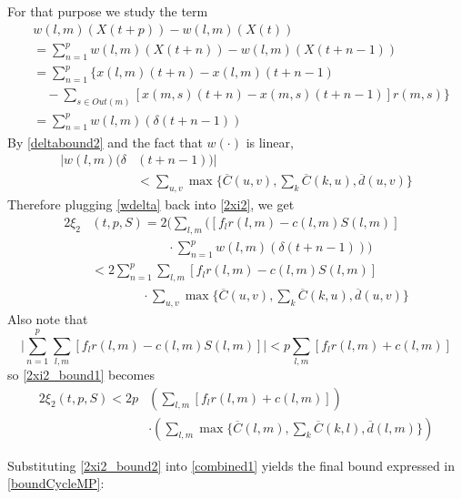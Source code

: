 %
For that purpose we study the term
\begin{align} \nonumber
&w(l,m)(X(t+p))   -  w(l,m)(X(t)) \\ \nonumber
& = \sum_{n=1}^{p} w(l,m)(X(t+n)) - w(l,m)(X(t + n - 1)) \\ \nonumber
&= \sum_{n=1}^{p} \Big\{ x(l,m)(t + n) - x(l,m)(t + n - 1)   \\ \nonumber 
&  \quad - \sum_{s \in Out(m)}[ x(m,s)(t + n) - x(m,s)(t + n - 1) ]r(m,s)  \Big\} \\ 
&= \sum_{n=1}^{p}  w(l,m)( \delta(t + n - 1)) 
\end{align}
By \eqref{deltabound2} and the fact that $w(\cdot)$ is linear,  
\begin{align} \nonumber
\vert w(l,m)(\delta&(t + n -1)) \vert \\  \label{wdelta}
&< \sum_{u,v} \max\Big\{  \overline{C}(u,v), \sum_{k}\overline{C}(k,u), \overline{d}(u,v)\Big\}
\end{align}
Therefore plugging \eqref{wdelta} back into \eqref{2xi2}, we get
\begin{align} \nonumber 
2\xi_2&(t,p,S) = 2\bigg( \sum_{l,m}\big([f_{l}r(l,m) - c(l,m)S(l,m)] \\  \nonumber
&\qquad \qquad \qquad \cdot \sum_{n=1}^{p}  w(l,m)( \delta(t + n - 1))\bigg)  \\ \nonumber
&< 2 \sum_{n=1}^{p}  \sum_{l,m}[f_{l}r(l,m) - c(l,m)S(l,m)] \\ 
&\qquad \qquad \cdot\sum_{u,v} \max\Big\{  \overline{C}(u,v), \sum_{k}\overline{C}(k,u), \overline{d}(u,v)\Big\} \label{2xi2_bound1}
\end{align}
Also note that 
\begin{equation}
\vert \sum_{n=1}^{p}  \sum_{l,m}[f_{l}r(l,m) - c(l,m)S(l,m)] \vert < p \sum_{l,m}[f_{l}r(l,m) + c(l,m)]
\end{equation}
so \eqref{2xi2_bound1} becomes
\begin{align} \label{2xi2_bound2}
2\xi_2(t,p,S) < 2 p &\left( \sum_{l,m}[f_{l}r(l,m) + c(l,m)]\right)\\ \nonumber
&\cdot\left( \sum_{l,m} \max\Big\{  \overline{C}(l,m), \sum_{k}\overline{C}(k,l), \overline{d}(l,m)\Big\} \right)
\end{align}

Substituting \eqref{2xi2_bound2} into \eqref{combined1} yields the final bound expressed in
 \eqref{boundCycleMP}:

